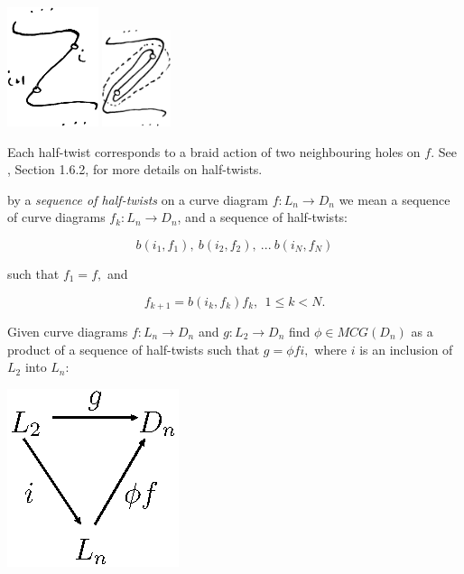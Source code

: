 \documentclass[12pt,a4paper]{article}
\begin{document}
\begin{center}
\includegraphics[width=0.2\textwidth]{halftwist-1.eps}
\includegraphics[width=0.15\textwidth]{halftwist-2.eps}
\end{center}

Each half-twist corresponds to a braid action of two neighbouring
holes on $f$.
See \cite{Kassel10}, Section 1.6.2, for more details on half-twists.

 by a {\it sequence of half-twists} on a curve
diagram $f:L_n\to D_n$ we mean a
sequence of curve diagrams $f_k: L_n\to D_n$, and a sequence of half-twists:

        $$ b(i_1, f_1),\ b(i_2, f_2),\ ...\ b(i_N, f_N) $$

such that $f_1=f,$ and

        $$ f_{k+1} = b(i_k, f_k) f_k,\ \  \text{} 1\leq k<N.$$




Given curve diagrams $f:L_n\to D_n$ and $g:L_2\to D_n$
find $\phi\in MCG(D_n)$ as a product of
a sequence of half-twists such that
$g = \phi f i,$ where $i$ is an inclusion of $L_2$ into $L_n:$

\begin{center}
\includegraphics{halftwist-factor.eps}
\end{center}
\end{document}
